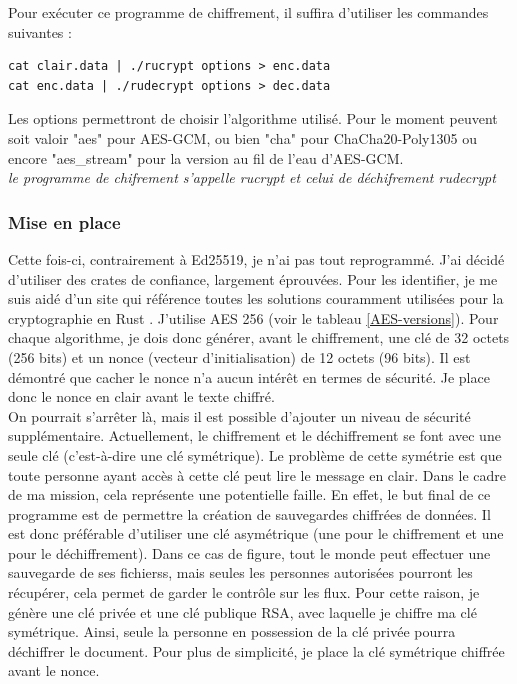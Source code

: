 \documentclass[a4paper, 12pt]{article}
\begin{document}
Pour exécuter ce programme de chiffrement, il suffira d'utiliser les commandes suivantes : 
\begin{verbatim}
cat clair.data | ./rucrypt options > enc.data
cat enc.data | ./rudecrypt options > dec.data
\end{verbatim}
Les options permettront de choisir l'algorithme utilisé. Pour le moment peuvent soit valoir "aes" pour AES-GCM, ou bien "cha" pour ChaCha20-Poly1305 ou encore "aes\_stream" pour la version au fil de l'eau d'AES-GCM.\\


\noindent\emph{le programme de chifrement s'appelle rucrypt et celui de déchifrement rudecrypt}

\subsubsection{Mise en place}
Cette fois-ci, contrairement à Ed25519, je n'ai pas tout reprogrammé. J'ai décidé d'utiliser des crates de confiance, largement éprouvées. Pour les identifier, je me suis aidé d'un site qui référence toutes les solutions couramment utilisées pour la cryptographie en Rust \cite{bddrustcrypto}. J'utilise AES 256 (voir le tableau \ref{AES-versions}). Pour chaque algorithme, je dois donc générer, avant le chiffrement, une clé de 32 octets (256 bits) et un nonce (vecteur d'initialisation) de 12 octets (96 bits). Il est démontré que cacher le nonce n'a aucun intérêt en termes de sécurité. Je place donc le nonce en clair avant le texte chiffré. \\

On pourrait s'arrêter là, mais il est possible d'ajouter un niveau de sécurité supplémentaire. Actuellement, le chiffrement et le déchiffrement se font avec une seule clé (c'est-à-dire une clé symétrique). Le problème de cette symétrie est que toute personne ayant accès à cette clé peut lire le message en clair. Dans le cadre de ma mission, cela représente une potentielle faille. En effet, le but final de ce programme est de permettre la création de sauvegardes chiffrées de données. Il est donc préférable d'utiliser une clé asymétrique (une pour le chiffrement et une pour le déchiffrement). Dans ce cas de figure, tout le monde peut effectuer une sauvegarde de ses fichierss, mais seules les personnes autorisées pourront les récupérer, cela permet de garder le contrôle sur les flux. Pour cette raison, je génère une clé privée et une clé publique RSA, avec laquelle je chiffre ma clé symétrique. Ainsi, seule la personne en possession de la clé privée pourra déchiffrer le document. Pour plus de simplicité, je place la clé symétrique chiffrée avant le nonce.
\end{document}
